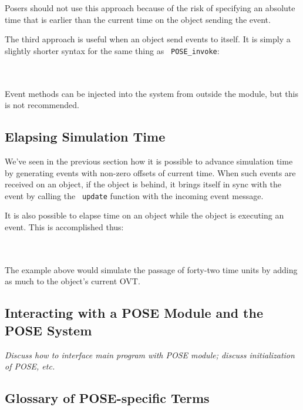 \documentclass[10pt]{article}
\begin{document}
Posers should not use this approach because of the risk of specifying
an absolute time that is earlier than the current time on the object
sending the event.  

The third approach is useful when an object send events to itself.  It
is simply a slightly shorter syntax for the same thing as {\tt
POSE\_invoke}: 

~\\
\\

Event methods can be injected into the system from outside the module,
but this is not recommended.  

\subsection{Elapsing Simulation Time}

We've seen in the previous section how it is possible to advance
simulation time by generating events with non-zero offsets of current
time.  When such events are received on an object, if the object is
behind, it brings itself in sync with the event by calling the {\tt
update} function with the incoming event message.  

It is also possible to elapse time on an object while the object is
executing an event.  This is accomplished thus:

~\\
\\

The example above would simulate the passage of forty-two time units
by adding as much to the object's current OVT.

\subsection{Interacting with a POSE Module and the POSE System}

{\it Discuss how to interface main program with POSE module; discuss
initialization of POSE, etc.}

\subsection{Glossary of POSE-specific Terms}
\end{document}
